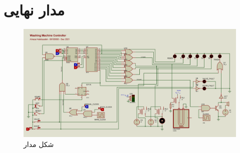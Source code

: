 \section{مدار نهایی}
\begin{figure}[h!]
    \centering
    \includegraphics[width=\textwidth]{part1/1.png}
    \caption{
    شکل مدار
    }
    \label{fig:final}
\end{figure}